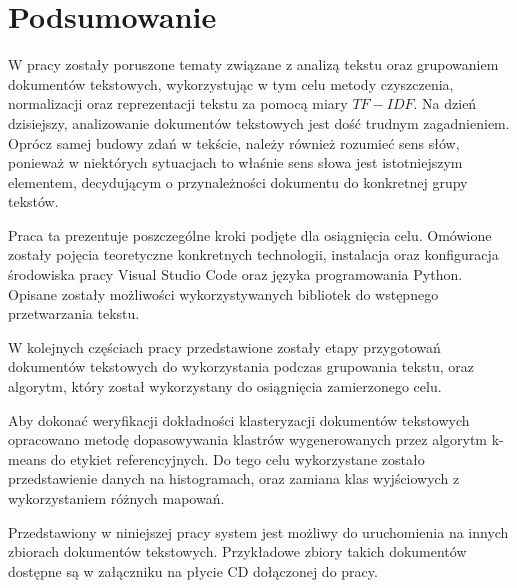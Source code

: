 \chapter{Podsumowanie}

W pracy zostały poruszone tematy związane z analizą tekstu oraz grupowaniem dokumentów tekstowych, wykorzystując w tym celu metody czyszczenia, normalizacji oraz reprezentacji tekstu za pomocą miary $TF-IDF$. Na dzień dzisiejszy, analizowanie dokumentów tekstowych jest dość trudnym zagadnieniem.  Oprócz samej budowy zdań w tekście, należy również rozumieć sens słów, ponieważ w niektórych sytuacjach to właśnie sens słowa jest istotniejszym elementem, decydującym o przynależności dokumentu do konkretnej grupy tekstów. 

Praca ta prezentuje poszczególne kroki podjęte dla osiągnięcia celu. Omówione zostały pojęcia teoretyczne konkretnych technologii, instalacja oraz konfiguracja środowiska pracy Visual Studio Code oraz języka programowania Python. Opisane zostały możliwości wykorzystywanych bibliotek do wstępnego przetwarzania tekstu.

W kolejnych częściach pracy przedstawione zostały etapy przygotowań dokumentów tekstowych do wykorzystania podczas grupowania tekstu, oraz algorytm, który został wykorzystany do osiągnięcia zamierzonego celu.

Aby dokonać weryfikacji dokładności klasteryzacji dokumentów tekstowych opracowano metodę dopasowywania klastrów wygenerowanych przez algorytm k-means do etykiet referencyjnych. Do tego celu wykorzystane zostało przedstawienie danych na histogramach, oraz zamiana klas wyjściowych z wykorzystaniem różnych mapowań.

Przedstawiony w niniejszej pracy system jest możliwy do uruchomienia na innych zbiorach dokumentów tekstowych. Przykładowe zbiory takich dokumentów dostępne są w załączniku na płycie CD dołączonej do pracy.
